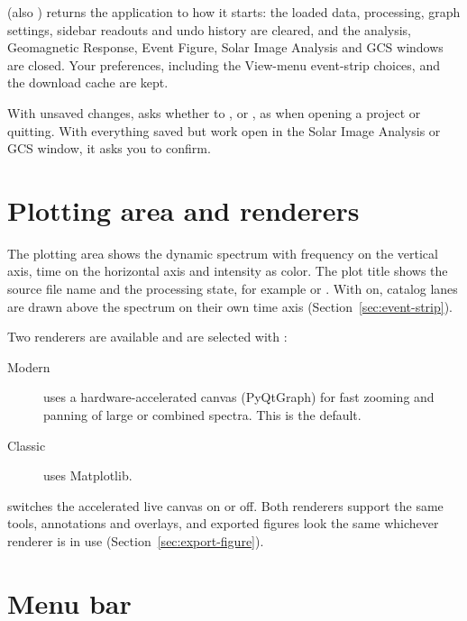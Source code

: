  (also ) returns the application to how
it starts: the loaded data, processing, graph settings, sidebar readouts and undo history are
cleared, and the analysis, Geomagnetic Response, Event Figure, Solar Image Analysis and GCS
windows are closed. Your preferences, including the View-menu event-strip choices, and the
download cache are kept.

\begin{caution}
  With unsaved changes,  asks whether to ,  or
  , as when opening a project or quitting. With everything saved but work open in
  the Solar Image Analysis or GCS window, it asks you to confirm.
\end{caution}

\section{Plotting area and renderers}
\label{sec:renderers}

The plotting area shows the dynamic spectrum with frequency on the vertical axis, time on
the horizontal axis and intensity as color. The plot title shows the source file name
and the processing state, for example  or
. With  on, catalog lanes are drawn
above the spectrum on their own time axis (Section~\ref{sec:event-strip}).

Two renderers are available and are selected with :
\begin{description}
  \item[Modern] uses a hardware-accelerated canvas (PyQtGraph) for fast zooming and
    panning of large or combined spectra. This is the default.
  \item[Classic] uses Matplotlib.
\end{description}
 switches the accelerated live canvas on
or off. Both renderers support the same tools, annotations and overlays, and exported
figures look the same whichever renderer is in use (Section~\ref{sec:export-figure}).

\section{Menu bar}
\label{sec:menus}

